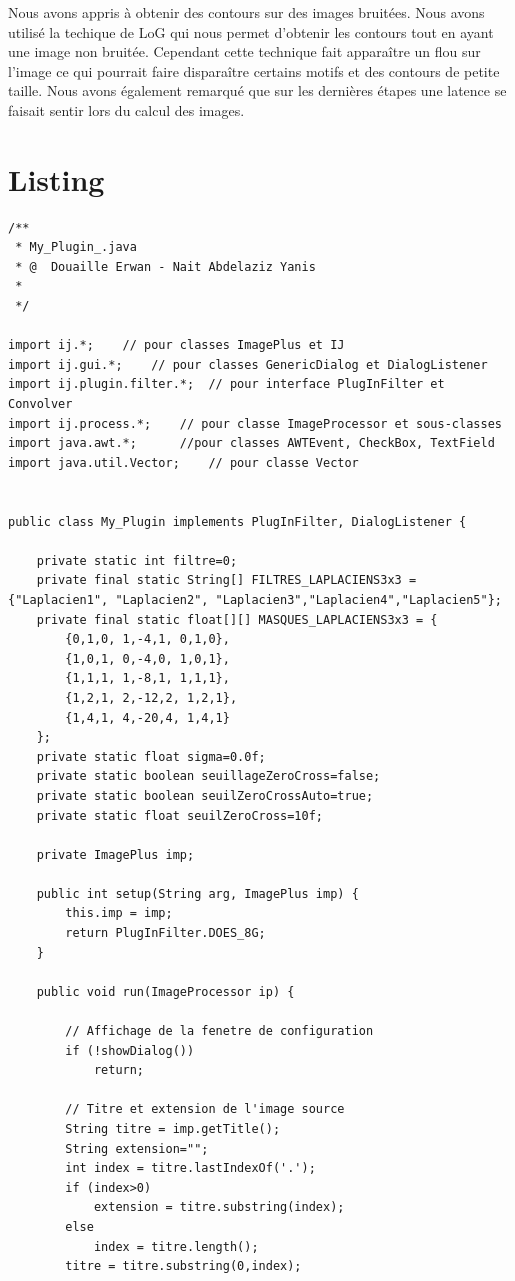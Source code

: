 \documentclass[a4paper,12pt]{report}
\begin{document}
Nous avons appris à obtenir des contours sur des images bruitées. Nous avons utilisé la techique de LoG qui nous permet d'obtenir les contours tout en ayant une image non bruitée. Cependant cette technique fait apparaître un flou sur l'image ce qui pourrait faire disparaître certains motifs et des contours de petite taille. Nous avons également remarqué que sur les dernières étapes une latence se faisait sentir lors du calcul des images.

\newpage

\section*{Listing}


\begin{lstlisting}[style=Java]
/**
 * My_Plugin_.java 
 * @  Douaille Erwan - Nait Abdelaziz Yanis
 *
 */

import ij.*;	// pour classes ImagePlus et IJ
import ij.gui.*;	// pour classes GenericDialog et DialogListener
import ij.plugin.filter.*;	// pour interface PlugInFilter et Convolver
import ij.process.*;	// pour classe ImageProcessor et sous-classes
import java.awt.*;		//pour classes AWTEvent, CheckBox, TextField
import java.util.Vector;	// pour classe Vector


public class My_Plugin implements PlugInFilter, DialogListener {
 
	private static int filtre=0;
	private final static String[] FILTRES_LAPLACIENS3x3 = {"Laplacien1", "Laplacien2", "Laplacien3","Laplacien4","Laplacien5"};
	private final static float[][] MASQUES_LAPLACIENS3x3 = {
		{0,1,0, 1,-4,1, 0,1,0},
		{1,0,1, 0,-4,0, 1,0,1},
		{1,1,1, 1,-8,1, 1,1,1},
		{1,2,1, 2,-12,2, 1,2,1},
		{1,4,1, 4,-20,4, 1,4,1}
	};
	private static float sigma=0.0f;
	private static boolean seuillageZeroCross=false;
	private static boolean seuilZeroCrossAuto=true;
	private static float seuilZeroCross=10f;
	
	private ImagePlus imp;

	public int setup(String arg, ImagePlus imp) {
		this.imp = imp;
		return PlugInFilter.DOES_8G;
	}

	public void run(ImageProcessor ip) {
		
		// Affichage de la fenetre de configuration
		if (!showDialog())
			return;

		// Titre et extension de l'image source
		String titre = imp.getTitle();
		String extension="";
		int index = titre.lastIndexOf('.');
		if (index>0)
			extension = titre.substring(index);
		else
			index = titre.length();
		titre = titre.substring(0,index);		
	

\end{lstlisting}
\end{document}
